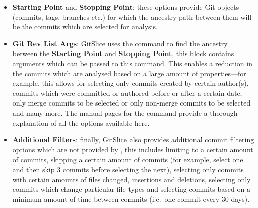\begin{itemize}
    \item \textbf{Starting Point} and \textbf{Stopping Point}: these options provide Git objects (commits, tags, branches etc.) for which the ancestry path between them will be the commits which are selected for analysis.
    \item \textbf{Git Rev List Args}: GitSlice uses the  command to find the ancestry between the \textbf{Starting Point} and \textbf{Stopping Point}, this block contains arguments which can be passed to this command.
          This enables a reduction in the commits which are analysed based on a large amount of properties---for example, this allows for selecting only commits created by certain author(s), commits which were committed or authored before or after a certain date, only merge commits to be selected or only non-merge commits to be selected and many more.
          The manual pages for the  command provide a thorough explanation of all the options available here.
    \item \textbf{Additional Filters}: finally, GitSlice also provides additional commit filtering options which are not provided by , this includes limiting to a certain amount of commits, skipping a certain amount of commits (for example, select one and then skip 3 commits before selecting the next), selecting only commits with certain amounts of files changed, insertions and deletions, selecting only commits which change particular file types and selecting commits based on a minimum amount of time between commits (i.e.\ one commit every 30 days).
\end{itemize}
